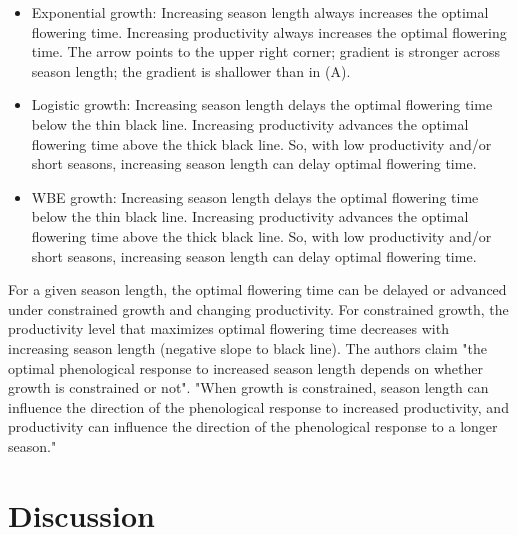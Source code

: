 \documentclass[12pt, oneside]{article}   	%
\begin{document}
\begin{itemize}
\item Exponential growth: Increasing season length always increases the optimal flowering time. Increasing productivity always increases the optimal flowering time. The arrow points to the upper right corner; gradient is stronger across season length; the gradient is shallower than in (A).
\item Logistic growth: Increasing season length delays the optimal flowering time below the thin black line. Increasing productivity advances the optimal flowering time above the thick black line. So, with low productivity and/or short seasons, increasing season length can delay optimal flowering time. 
\item WBE growth: Increasing season length delays the optimal flowering time below the thin black line.  Increasing productivity advances the optimal flowering time above the thick black line. So, with low productivity and/or short seasons, increasing season length can delay optimal flowering time. 
\end{itemize}

For a given season length, the optimal flowering time can be delayed or advanced under constrained growth and changing productivity. For constrained growth, the productivity level that maximizes optimal flowering time decreases with increasing season length (negative slope to black line). The authors claim "the optimal phenological response to increased season length depends on whether growth is constrained or not". "When growth is constrained, season length can influence the direction of the phenological response to increased productivity, and productivity can influence the direction of the phenological response to a longer season."

\section{Discussion}
\end{document}
